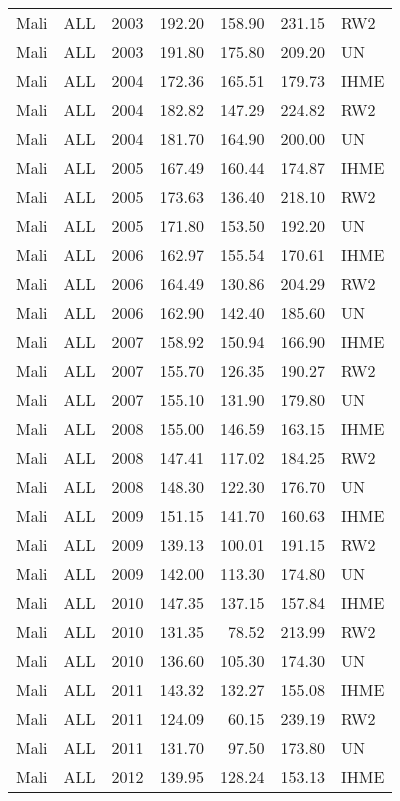 \begin{longtable}{lllrrrl}
  Mali & ALL & 2003 & 192.20 & 158.90 & 231.15 & RW2 \\ 
  Mali & ALL & 2003 & 191.80 & 175.80 & 209.20 & UN \\ 
  Mali & ALL & 2004 & 172.36 & 165.51 & 179.73 & IHME \\ 
  Mali & ALL & 2004 & 182.82 & 147.29 & 224.82 & RW2 \\ 
  Mali & ALL & 2004 & 181.70 & 164.90 & 200.00 & UN \\ 
  Mali & ALL & 2005 & 167.49 & 160.44 & 174.87 & IHME \\ 
  Mali & ALL & 2005 & 173.63 & 136.40 & 218.10 & RW2 \\ 
  Mali & ALL & 2005 & 171.80 & 153.50 & 192.20 & UN \\ 
  Mali & ALL & 2006 & 162.97 & 155.54 & 170.61 & IHME \\ 
  Mali & ALL & 2006 & 164.49 & 130.86 & 204.29 & RW2 \\ 
  Mali & ALL & 2006 & 162.90 & 142.40 & 185.60 & UN \\ 
  Mali & ALL & 2007 & 158.92 & 150.94 & 166.90 & IHME \\ 
  Mali & ALL & 2007 & 155.70 & 126.35 & 190.27 & RW2 \\ 
  Mali & ALL & 2007 & 155.10 & 131.90 & 179.80 & UN \\ 
  Mali & ALL & 2008 & 155.00 & 146.59 & 163.15 & IHME \\ 
  Mali & ALL & 2008 & 147.41 & 117.02 & 184.25 & RW2 \\ 
  Mali & ALL & 2008 & 148.30 & 122.30 & 176.70 & UN \\ 
  Mali & ALL & 2009 & 151.15 & 141.70 & 160.63 & IHME \\ 
  Mali & ALL & 2009 & 139.13 & 100.01 & 191.15 & RW2 \\ 
  Mali & ALL & 2009 & 142.00 & 113.30 & 174.80 & UN \\ 
  Mali & ALL & 2010 & 147.35 & 137.15 & 157.84 & IHME \\ 
  Mali & ALL & 2010 & 131.35 & 78.52 & 213.99 & RW2 \\ 
  Mali & ALL & 2010 & 136.60 & 105.30 & 174.30 & UN \\ 
  Mali & ALL & 2011 & 143.32 & 132.27 & 155.08 & IHME \\ 
  Mali & ALL & 2011 & 124.09 & 60.15 & 239.19 & RW2 \\ 
  Mali & ALL & 2011 & 131.70 & 97.50 & 173.80 & UN \\ 
  Mali & ALL & 2012 & 139.95 & 128.24 & 153.13 & IHME \\ 

\end{longtable}
